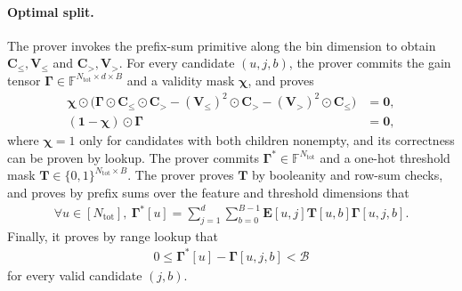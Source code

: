 \paragraph{Optimal split.}
The prover invokes the prefix-sum primitive along the bin dimension to obtain
$\mathbf{C}_{\leq},\mathbf{V}_{\leq}$ and
$\mathbf{C}_{>},\mathbf{V}_{>}$.
For every candidate $(u,j,b)$, the prover commits the gain tensor
$\boldsymbol{\Gamma}\in\mathbb{F}^{N_{\mathrm{tot}}\times d\times B}$
and a validity mask $\boldsymbol{\chi}$, and proves
\begin{align}
    \boldsymbol{\chi}\odot
    \bigl(
    \boldsymbol{\Gamma}\odot\mathbf{C}_{\leq}\odot\mathbf{C}_{>}
    -(\mathbf{V}_{\leq})^2\odot\mathbf{C}_{>}
    -(\mathbf{V}_{>})^2\odot\mathbf{C}_{\leq}
    \bigr)
    &=\mathbf{0},\\
    (\mathbf{1}-\boldsymbol{\chi})\odot\boldsymbol{\Gamma}
    &=\mathbf{0},
\end{align}
where $\boldsymbol{\chi}=1$ only for candidates with both children nonempty,
and its correctness can be proven by lookup.
The prover commits $\boldsymbol{\Gamma}^{*}\in
\mathbb{F}^{N_{\mathrm{tot}}}$ and a one-hot threshold mask
$\mathbf{T}\in \{0, 1\}^{N_{\mathrm{tot}}\times B}$.
The prover proves $\mathbf{T}$ by booleanity and row-sum checks, and proves
by prefix sums over the feature and threshold dimensions that
\begin{align}
    \forall u\in [N_{\mathrm{tot}}],\ 
    \boldsymbol{\Gamma}^{*}[u]
    =
    \sum_{j=1}^{d}\sum_{b=0}^{B-1}
    \mathbf{E}[u,j]\mathbf{T}[u,b]\boldsymbol{\Gamma}[u,j,b].
\end{align}
Finally, it proves by range lookup that
\begin{align}
    0\leq
    \boldsymbol{\Gamma}^{*}[u]
    -
    \boldsymbol{\Gamma}[u,j,b]
    <\mathcal{B}
\end{align}
for every valid candidate $(j,b)$.

